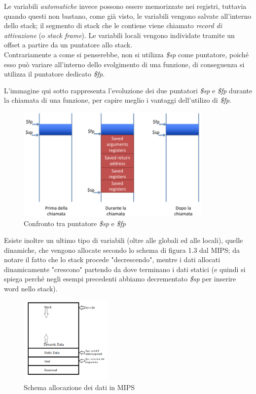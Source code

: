 \documentclass[class=book, crop=false]{standalone}
\begin{document}
Le variabili \emph{automatiche} invece possono essere memorizzate nei registri, tuttavia quando questi non bastano, come già visto, le variabili vengono salvate all'interno dello stack; il segmento di stack che le contiene viene chiamato \emph{record di attivazione} (o \emph{stack frame}). Le variabili locali vengono individate tramite un offset a partire da un puntatore allo stack.\\
Contrariamente a come si penserebbe, non si utilizza \emph{\$sp} come puntatore, poiché esso può variare all'interno dello svolgimento di una funzione, di conseguenza si utilizza il puntatore dedicato \emph{\$fp}.

L'immagine qui sotto rappresenta l'evoluzione dei due puntatori \emph{\$sp} e \emph{\$fp} durante la chiamata di una funzione, per capire meglio i vantaggi dell'utilizo di \emph{\$fp}.
\begin{figure}[H]
	\centering
	\includegraphics[width=0.85\textwidth,keepaspectratio]{sp-vs-fp}
	\caption{Confronto tra puntatore \emph{\$sp} e \emph{\$fp}}
\end{figure}

Esiste inoltre un ultimo tipo di variabili (oltre alle globali ed alle locali), quelle dinamiche, che vengono allocate secondo lo schema di figura 1.3 dal MIPS; da notare il fatto che lo stack procede "decrescendo", mentre i dati allocati dinamicamente "crescono"  partendo da dove terminano i dati statici (e quindi si spiega perché negli esempi precedenti abbiamo decrementato \emph{\$sp} per inserire word nello stack).
\begin{figure}[H]
	\centering
	\includegraphics[width=0.4\textwidth,keepaspectratio]{Dove-finiscono-le-variabili}
	\caption{Schema allocazione dei dati in MIPS}
\end{figure}
\end{document}
